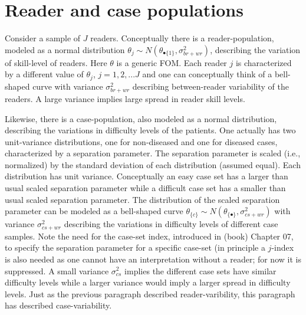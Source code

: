 \documentclass[
]{book}
\begin{document}
\hypertarget{dbm-analysis-background-reader-case-populations}{%
\section{Reader and case populations}\label{dbm-analysis-background-reader-case-populations}}

Consider a sample of \(J\) readers. Conceptually there is a reader-population, modeled as a normal distribution \(\theta_j \sim N\left ( \theta_{\bullet\{1\}}, \sigma_{br+wr}^{2} \right )\), describing the variation of skill-level of readers. Here \(\theta\) is a generic FOM. Each reader \(j\) is characterized by a different value of \(\theta_j\), \(j=1,2,...J\) and one can conceptually think of a bell-shaped curve with variance \(\sigma_{br+wr}^{2}\) describing between-reader variability of the readers. A large variance implies large spread in reader skill levels.

Likewise, there is a case-population, also modeled as a normal distribution, describing the variations in difficulty levels of the patients. One actually has two unit-variance distributions, one for non-diseased and one for diseased cases, characterized by a separation parameter. The separation parameter is scaled (i.e., normalized) by the standard deviation of each distribution (assumed equal). Each distribution has unit variance. Conceptually an easy case set has a larger than usual scaled separation parameter while a difficult case set has a smaller than usual scaled separation parameter. The distribution of the scaled separation parameter can be modeled as a bell-shaped curve \(\theta_{\{c\}} \sim N\left ( \theta_{\{\bullet\}}, \sigma_{cs+wr}^{2} \right )\) with variance \(\sigma_{cs+wr}^{2}\) describing the variations in difficulty levels of different case samples. Note the need for the case-set index, introduced in (book) Chapter 07, to specify the separation parameter for a specific case-set (in principle a \(j\)-index is also needed as one cannot have an interpretation without a reader; for now it is suppressed. A small variance \(\sigma_{cs}^{2}\) implies the different case sets have similar difficulty levels while a larger variance would imply a larger spread in difficulty levels. Just as the previous paragraph described reader-varibility, this paragraph has described case-variability.
\end{document}
